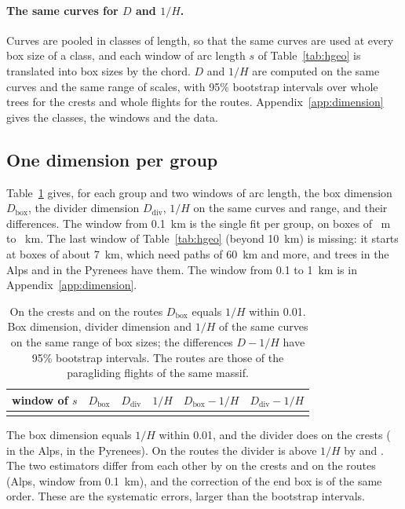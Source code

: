 \paragraph{The same curves for $D$ and $1/H$.} Curves are pooled in classes of length, so that the same curves are used at every box size of a class, and each window of arc length $s$ of Table~\ref{tab:hgeo} is
translated into box sizes by the chord. $D$ and $1/H$ are computed on the same curves and the same range of scales, with 95\% bootstrap intervals over whole trees for the crests and whole flights for the routes.
Appendix~\ref{app:dimension} gives the classes, the windows and the data.

\subsection{One dimension per group}

Table~\ref{tab:dim} gives, for each group and two windows of arc length, the box dimension $D_{\mathrm{box}}$, the divider dimension $D_{\mathrm{div}}$, $1/H$ on the same curves and range, and their differences.
The window from 0.1~km is the single fit per group, on boxes of \DmEpsMin~m to \DmCrAlpsFromEpsHiKm~km. The last window of Table~\ref{tab:hgeo} (beyond 10~km) is missing: it starts at boxes of about 7~km, which
need paths of 60~km and more, and \DmPoolAlpsGroups{} trees in the Alps and \DmPoolPyrGroups{} in the Pyrenees have them. The window from 0.1 to 1~km is in Appendix~\ref{app:dimension}.

\begin{table}[H]
\centering
\caption{On the crests and on the routes $D_{\mathrm{box}}$ equals $1/H$ within 0.01. Box dimension, divider dimension and $1/H$ of the same curves on the same range of box sizes; the differences
$D-1/H$ have 95\% bootstrap intervals. The routes are those of the paragliding flights of the same massif.}
\label{tab:dim}
\small
\setlength{\tabcolsep}{4pt}
\begin{tabular}{lccccc}
\toprule
window of $s$ & $D_{\mathrm{box}}$ & $D_{\mathrm{div}}$ & $1/H$ & $D_{\mathrm{box}}-1/H$ & $D_{\mathrm{div}}-1/H$ \\
\midrule
\\
\bottomrule
\end{tabular}
\end{table}

The box dimension equals $1/H$ within 0.01, and the divider does on the crests (\DmCrAlpsFromDiffDiv{} in the Alps, \DmCrPyrFromDiffDiv{} in the Pyrenees). On the routes the divider is above $1/H$ by
\DmRtAlpsFromDiffDiv{} and \DmRtPyrFromDiffDiv. The two estimators differ from each other by \DmEstSpread{} on the crests and \DmEstSpreadRoute{} on the routes (Alps, window from 0.1~km), and the correction of the end box
is of the same order. These are the systematic errors, larger than the bootstrap intervals.

